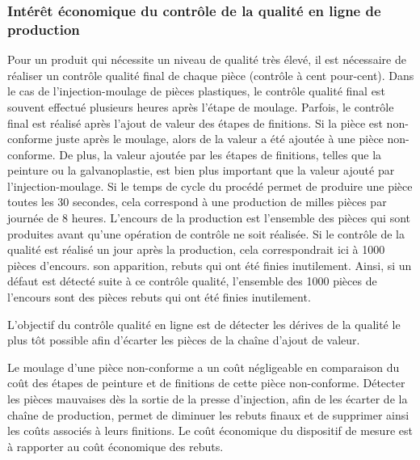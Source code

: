 \subsubsection{Intérêt économique du contrôle de la qualité en ligne de production}
Pour un produit qui nécessite un niveau de qualité très élevé, il est nécessaire de réaliser un contrôle qualité final de chaque pièce (contrôle à cent pour-cent).
Dans le cas de l'injection-moulage de pièces plastiques, le contrôle qualité final est souvent effectué plusieurs heures après l’étape de moulage.
Parfois, le contrôle final est réalisé après l’ajout de valeur des étapes de finitions.  %
Si la pièce est non-conforme juste après le moulage, alors de la valeur a été ajoutée à une pièce non-conforme.
De plus, la valeur ajoutée par les étapes de finitions, telles que la peinture ou la galvanoplastie, est bien plus important que la valeur ajouté par l'injection-moulage.
Si le temps de cycle du procédé permet de produire une pièce toutes les 30 secondes, cela correspond à une production de milles pièces par journée de 8 heures.
L'encours de la production est l'ensemble des pièces qui sont produites avant qu'une opération de contrôle ne soit réalisée.
Si le contrôle de la qualité est réalisé un jour après la production, cela correspondrait ici à 1000 pièces d'encours.
son apparition, rebuts qui ont été finies inutilement.
Ainsi, si un défaut est détecté suite à ce contrôle qualité, l'ensemble des 1000 pièces de l'encours sont des pièces rebuts qui ont été finies inutilement.

L’objectif du contrôle qualité en ligne est de détecter les dérives de la qualité le plus tôt possible afin d'écarter les pièces de la chaîne d'ajout de valeur.

Le moulage d'une pièce non-conforme a un coût négligeable en comparaison du coût des étapes de peinture et de finitions de cette pièce non-conforme.
Détecter les pièces mauvaises dès la sortie de la presse d’injection, afin de les écarter de la chaîne de production, permet de diminuer les rebuts finaux et de supprimer ainsi les coûts associés à leurs finitions.
Le coût économique du dispositif de mesure est à rapporter au coût économique des rebuts.

